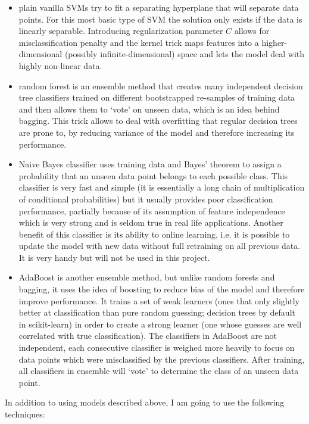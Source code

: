 \documentclass[10pt, a4paper]{article}
\begin{document}
\begin{itemize}
	\item plain vanilla SVMs try to fit a separating hyperplane that will separate data points. For this most basic type of SVM the solution only exists if the data is linearly separable. Introducing regularization parameter $C$ allows for misclassification penalty and the kernel trick maps features into a higher-dimensional (possibly infinite-dimensional) space and lets the model deal with highly non-linear data.
	\item random forest is an ensemble method that creates many independent decision tree classifiers trained on different bootstrapped re-samples of training data and then allows them to `vote' on unseen data, which is an idea behind bagging. This trick allows to deal with overfitting that regular decision trees are prone to, by reducing variance of the model and therefore increasing its performance.
	\item Naive Bayes classifier uses training data and Bayes' theorem to assign a probability that an unseen data point belongs to each possible class. This classifier is very fast and simple (it is essentially a long chain of multiplication of conditional probabilities) but it usually provides poor classification performance, partially because of its assumption of feature independence which is very strong and is seldom true in real life applications. Another benefit of this classifier is its ability to online learning, i.e. it is possible to update the model with new data without full retraining on all previous data. It is very handy but will not be used in this project.
	\item AdaBoost is another ensemble method, but unlike random forests and bagging, it uses the idea of boosting to reduce bias of the model and therefore improve performance. It trains a set of weak learners (ones that only slightly better at classification than pure random guessing; decision trees by default in scikit-learn) in order to create a strong learner (one whose guesses are well correlated with true classification). The classifiers in AdaBoost are not independent, each consecutive classifier is weighed more heavily to focus on data points which were misclassified by the previous classifiers. After training, all classifiers in ensemble will `vote' to determine the class of an unseen data point.
\end{itemize}
In addition to using models described above, I am going to use the following techniques:
\end{document}
